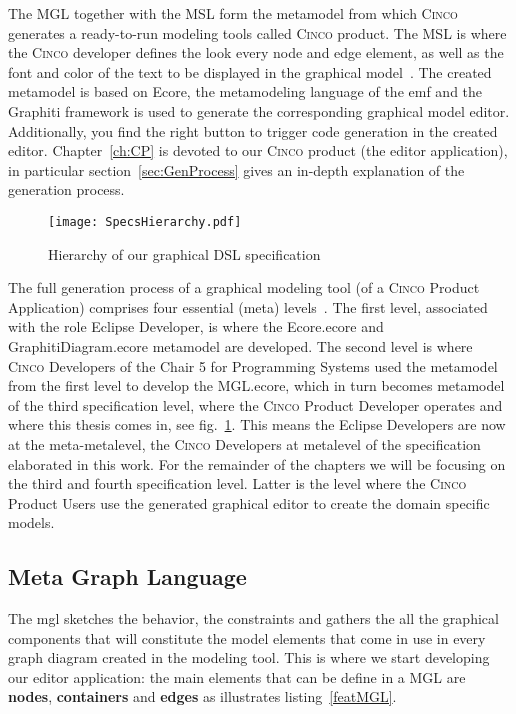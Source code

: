 The MGL together with the MSL form the metamodel from which \textsc{Cinco} generates a ready-to-run modeling tools called \textsc{Cinco} product. The MSL is where the \textsc{Cinco} developer defines the look every node and edge element, as well as the font and color of the text to be displayed in the graphical model~\cite{naujokat-diss}. The created metamodel is based on Ecore, the metamodeling language of the \gls{emf} and the Graphiti framework is used to generate the corresponding graphical model editor. Additionally, you find the right button to trigger code generation in the created editor. Chapter~\ref{ch:CP} is devoted to our \textsc{Cinco} product (the editor application), in particular section~\ref{sec:GenProcess} gives an in-depth explanation of the generation process.

\begin{figure}[h]
    \centering
    \texttt{[image: SpecsHierarchy.pdf]}
    \caption{Hierarchy of our graphical DSL specification}
    \label{fig:modeling-hierachy}
\end{figure}

The full generation process of a graphical modeling tool (of a \textsc{Cinco} Product Application) comprises four essential (meta) levels~\cite{Naujokat2018}. The first level, associated with the role Eclipse Developer, is where the Ecore.ecore and GraphitiDiagram.ecore metamodel are developed. The second level is where \textsc{Cinco} Developers of the Chair 5 for Programming Systems used the metamodel from the first level to develop the MGL.ecore, which in turn becomes metamodel of the third specification level, where the \textsc{Cinco} Product Developer operates and where this thesis comes in, see fig.~\ref{fig:modeling-hierachy}. This means the Eclipse Developers are now at the meta-metalevel, the \textsc{Cinco} Developers at metalevel of the specification elaborated in this work. For the remainder of the chapters we will be focusing on the third and fourth specification level. Latter is the level where the \textsc{Cinco} Product Users use the generated graphical editor to create the domain specific models.

\subsection{Meta Graph Language}\label{sec:MGL}

The \gls*{mgl} sketches the behavior, the constraints and gathers the all the graphical components that will constitute the model elements that come in use in every graph diagram created in the modeling tool. This is where we start developing our editor application: the main elements that can be define in a MGL are \textbf{nodes}, \textbf{containers} and \textbf{edges} as illustrates listing~\ref{featMGL}.


